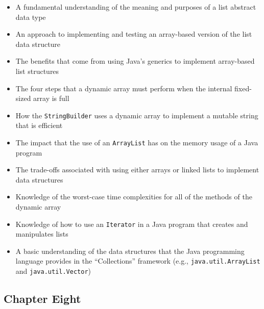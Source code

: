 \documentclass[11pt]{article}
\newcommand{\program}[1]{\lstinline{#1}}
\begin{document}
\begin{itemize}

  \setlength{\itemsep}{0.05in}

  \item A fundamental understanding of the meaning and purposes of a list
    abstract data type

  \item An approach to implementing and testing an array-based version of the
    list data structure

  \item The benefits that come from using Java's generics to implement
    array-based list structures

  \item The four steps that a dynamic array must perform when the internal
    fixed-sized array is full

  \item How the \program{StringBuilder} uses a dynamic array to implement
    a mutable string that is efficient

  \item The impact that the use of an \program{ArrayList} has on the memory
    usage of a Java program

  \item The trade-offs associated with using either arrays or linked lists to implement data structures

  \item Knowledge of the worst-case time complexities for all of the methods
    of the dynamic array

  \item Knowledge of how to use an \program{Iterator} in a Java program that
    creates and manipulates lists

  \item A basic understanding of the data structures that the Java programming
    language provides in the ``Collections'' framework (e.g.,
    \program{java.util.ArrayList} and \program{java.util.Vector})

\end{itemize}

\vspace*{-.2in}
\subsection*{Chapter Eight}
\end{document}
